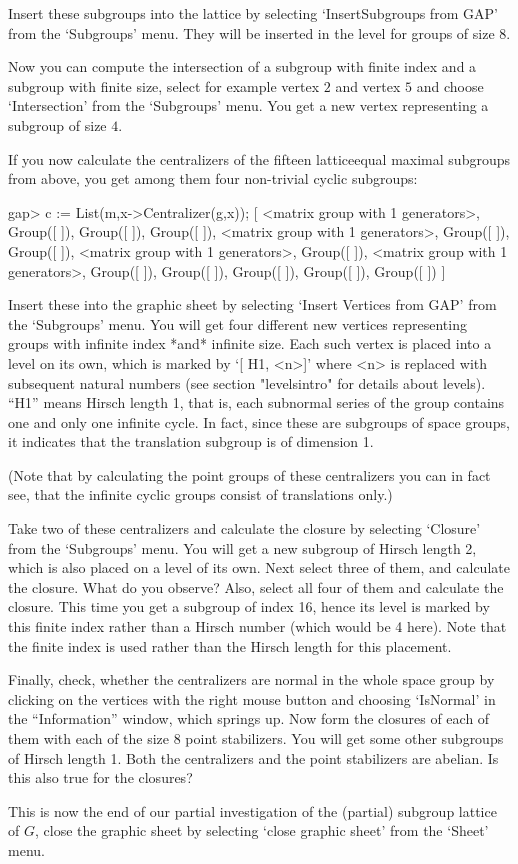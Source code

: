 Insert these subgroups into the lattice by selecting
`InsertSubgroups from GAP' from the `Subgroups' menu. They will be
inserted in the level for groups of size 8.

Now you can compute the intersection of a subgroup with finite index
and a subgroup with finite size, select for example vertex $2$ and vertex
$5$ and choose `Intersection' from the `Subgroups' menu. You get a new 
vertex representing a subgroup of size $4$.

If you now calculate the centralizers of the fifteen latticeequal maximal 
subgroups from above, you get among them four non-trivial cyclic subgroups:

\begintt
gap> c := List(m,x->Centralizer(g,x));
[ <matrix group with 1 generators>, Group([  ]), Group([  ]), Group([  ]), 
  <matrix group with 1 generators>, Group([  ]), Group([  ]), 
  <matrix group with 1 generators>, Group([  ]), 
  <matrix group with 1 generators>, Group([  ]), Group([  ]), Group([  ]), 
  Group([  ]), Group([  ]) ]
\endtt

Insert these into the graphic sheet by selecting `Insert Vertices from GAP'
from the `Subgroups' menu. You
will get four different new vertices representing groups with infinite
index *and* infinite size.  Each such vertex is placed into a level on
its own, which is marked by `[ H1, <n>]' where <n> is replaced
with subsequent natural numbers (see section "levelsintro" for details
about levels). ``H1'' means Hirsch length 1, that is, each subnormal series
of the group contains one and only one infinite cycle. In fact, since
these are subgroups of space groups, it indicates that the translation
subgroup is of dimension 1.

(Note that by calculating the point groups of these centralizers you can 
in fact see, that the infinite cyclic groups consist of translations only.)

Take two of these centralizers and calculate the closure by selecting
`Closure' from the `Subgroups' menu. You will get a new subgroup
of Hirsch length 2, which is also placed on a level of its own. Next
select three of them, and calculate the closure. What do you observe?
Also, select all four of them and calculate the closure. This time 
you get a subgroup of index 16, hence its level is marked by this finite
index rather than a Hirsch number (which would be 4 here). Note that
the finite index is used rather than the Hirsch length for this placement.

Finally, check, whether the centralizers are normal in the whole space
group by clicking on the vertices with the right mouse button and
choosing `IsNormal' in the ``Information'' window, which springs up.
Now form the closures of each of them with each of the size 8 point 
stabilizers. You will get some other subgroups of Hirsch length 1.
Both the centralizers and the point stabilizers are abelian. Is this also
true for the closures?

This  is now  the end of   our partial investigation  of the (partial)
subgroup lattice  of $G$, close  the graphic sheet by selecting `close
graphic sheet' from the `Sheet' menu.


